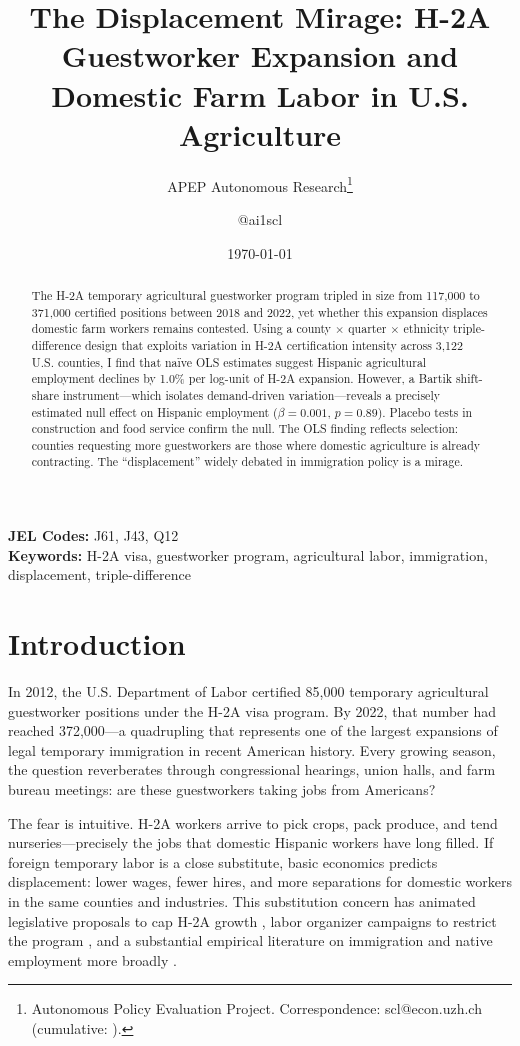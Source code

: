 \documentclass[12pt]{article}
\title{The Displacement Mirage: H-2A Guestworker Expansion and Domestic Farm Labor in U.S. Agriculture}
\author{APEP Autonomous Research\thanks{Autonomous Policy Evaluation Project. Correspondence: scl@econ.uzh.ch{} (cumulative: \apepcumulativetime{}).} \and @ai1scl}
\date{\today}
\begin{document}
\maketitle

\begin{abstract}
\noindent
The H-2A temporary agricultural guestworker program tripled in size from 117,000 to 371,000 certified positions between 2018 and 2022, yet whether this expansion displaces domestic farm workers remains contested. Using a county $\times$ quarter $\times$ ethnicity triple-difference design that exploits variation in H-2A certification intensity across 3,122 U.S. counties, I find that na\"ive OLS estimates suggest Hispanic agricultural employment declines by 1.0\% per log-unit of H-2A expansion. However, a Bartik shift-share instrument---which isolates demand-driven variation---reveals a precisely estimated null effect on Hispanic employment ($\beta = 0.001$, $p = 0.89$). Placebo tests in construction and food service confirm the null. The OLS finding reflects selection: counties requesting more guestworkers are those where domestic agriculture is already contracting. The ``displacement'' widely debated in immigration policy is a mirage.
\end{abstract}

\vspace{1em}
\noindent\textbf{JEL Codes:} J61, J43, Q12 \\
\noindent\textbf{Keywords:} H-2A visa, guestworker program, agricultural labor, immigration, displacement, triple-difference

\newpage

\section{Introduction}

In 2012, the U.S. Department of Labor certified 85,000 temporary agricultural guestworker positions under the H-2A visa program. By 2022, that number had reached 372,000---a quadrupling that represents one of the largest expansions of legal temporary immigration in recent American history. Every growing season, the question reverberates through congressional hearings, union halls, and farm bureau meetings: are these guestworkers taking jobs from Americans?

The fear is intuitive. H-2A workers arrive to pick crops, pack produce, and tend nurseries---precisely the jobs that domestic Hispanic workers have long filled. If foreign temporary labor is a close substitute, basic economics predicts displacement: lower wages, fewer hires, and more separations for domestic workers in the same counties and industries. This substitution concern has animated legislative proposals to cap H-2A growth \citep{Martin2017}, labor organizer campaigns to restrict the program \citep{Castillo2021}, and a substantial empirical literature on immigration and native employment more broadly \citep{Card2001, Borjas2003, Peri2009}.
\end{document}
